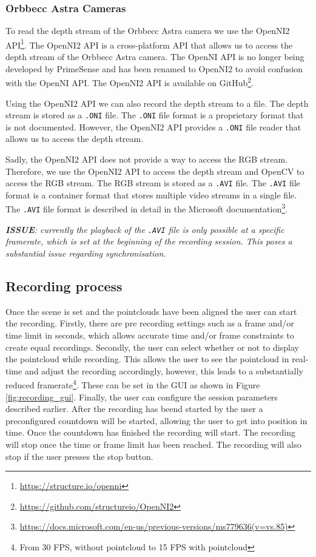 \subsubsection{Orbbecc Astra Cameras}

To read the depth stream of the Orbbecc Astra camera we use the OpenNI2 API\footnote{\url{https://structure.io/openni}}. The OpenNI2 API is a cross-platform API that allows us to access the depth stream of the Orbbecc Astra camera. The OpenNI API is no longer being developed by PrimeSense and has been renamed to OpenNI2 to avoid confusion with the OpenNI API. The OpenNI2 API is available on GitHub\footnote{\url{https://github.com/structureio/OpenNI2}}.

Using the OpenNI2 API we can also record the depth stream to a file. The depth stream is stored as a \texttt{.ONI} file. The \texttt{.ONI} file format is a proprietary format that is not documented. However, the OpenNI2 API provides a \texttt{.ONI} file reader that allows us to access the depth stream.

Sadly, the OpenNI2 API does not provide a way to access the RGB stream. Therefore, we use the OpenNI2 API to access the depth stream and OpenCV to access the RGB stream. The RGB stream is stored as a \texttt{.AVI} file. The \texttt{.AVI} file format is a container format that stores multiple video streams in a single file. The \texttt{.AVI} file format is described in detail in the Microsoft documentation\footnote{\url{https://docs.microsoft.com/en-us/previous-versions/ms779636(v=vs.85)}}. 

\textit{
  \textbf{ISSUE}: currently the playback of the \texttt{.AVI} file is only possible at a specific framerate, which is set at the beginning of the recording session. This poses a substantial issue regarding synchronisation. 
}

\subsection{Recording process}

Once the scene is set and the pointclouds have been aligned the user can start the recording. Firstly, there are pre recording settings such as a frame and/or time limit in seconds, which allows accurate time and/or frame constraints to create equal recordings. Secondly, the user can select whether or not to display the pointcloud while recording. This allows the user to see the pointcloud in real-time and adjust the recording accordingly, however, this leads to a substantially reduced framerate\footnote{From 30 FPS, without pointcloud to 15 FPS with pointcloud}. These can be set in the GUI as shown in Figure \ref{fig:recording_gui}. Finally, the user can configure the session parameters described earlier. After the recording has beend started by the user a preconfigured countdown will be started, allowing the user to get into position in time. Once the countdown has finished the recording will start. The recording will stop once the time or frame limit has been reached. The recording will also stop if the user presses the stop button.  

